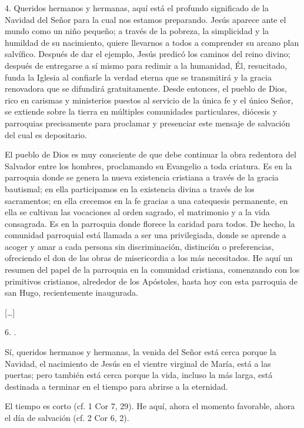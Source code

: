 \begin{body}
\begin{body}
4. Queridos hermanos y hermanas, aquí está el profundo significado de la Navidad del Señor para la cual nos estamos preparando. Jesús aparece ante el mundo como un niño pequeño; a través de la pobreza, la simplicidad y la humildad de su nacimiento, quiere llevarnos a todos a comprender su arcano plan salvífico. Después de dar el ejemplo, Jesús predicó los caminos del reino divino; después de entregarse a sí mismo para redimir a la humanidad, Él, resucitado, funda la Iglesia al confiarle la verdad eterna que se transmitirá y la gracia renovadora que se difundirá gratuitamente. Desde entonces, el pueblo de Dios, rico en carismas y ministerios puestos al servicio de la única fe y el único Señor, se extiende sobre la tierra en múltiples comunidades particulares, diócesis y parroquias precisamente para proclamar y presenciar este mensaje de salvación del cual es depositario.

El pueblo de Dios es muy consciente de que debe continuar la obra redentora del Salvador entre los hombres, proclamando su Evangelio a toda criatura. Es en la parroquia donde se genera la nueva existencia cristiana a través de la gracia bautismal; en ella participamos en la existencia divina a través de los sacramentos; en ella crecemos en la fe gracias a una catequesis permanente, en ella se cultivan las vocaciones al orden sagrado, el matrimonio y a la vida consagrada. Es en la parroquia donde florece la caridad para todos. De hecho, la comunidad parroquial está llamada a ser una  privilegiada, donde se aprende a acoger y amar a cada persona sin discriminación, distinción o preferencias, ofreciendo el don de las obras de misericordia a los más necesitados. He aquí un resumen del papel de la parroquia en la comunidad cristiana, comenzando con los primitivos cristianos, alrededor de los Apóstoles, hasta hoy con esta parroquia de san Hugo, recientemente inaugurada.

{[}\ldots{}{]}

6. .

Sí, queridos hermanos y hermanas, la venida del Señor está cerca porque la Navidad, el nacimiento de Jesús en el vientre virginal de María, está a las puertas; pero también está cerca porque la vida, incluso la más larga, está destinada a terminar en el tiempo para abrirse a la eternidad.

El tiempo es corto (cf. 1 Cor 7, 29). He aquí, ahora el momento favorable, ahora el día de salvación (cf. 2 Cor 6, 2).


\end{body}
\end{body}
